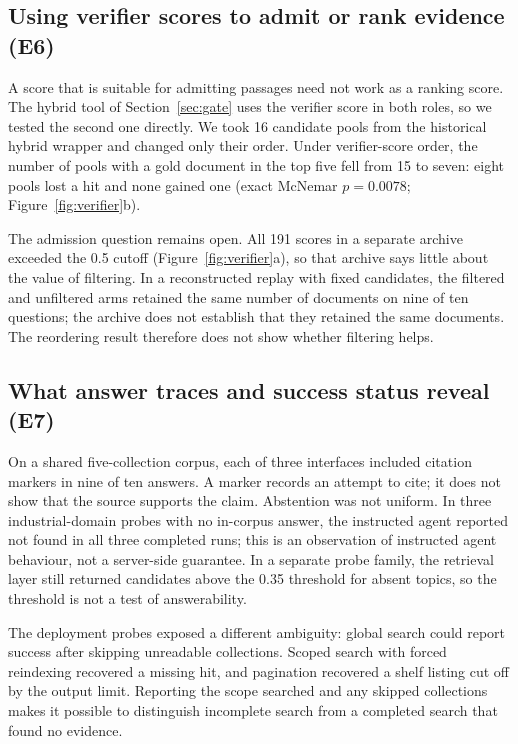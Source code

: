\subsection{Using verifier scores to admit or rank evidence (E6)}
\label{sec:e6}
\label{sec:inflation}\label{sec:eval-verify}\label{sec:exp-e6}
A score that is suitable for admitting passages need not work as a ranking
score. The hybrid tool of Section~\ref{sec:gate} uses the verifier score in
both roles, so we tested the second one directly. We took 16 candidate pools
from the historical hybrid wrapper and changed only their order. Under
verifier-score order, the number of pools with a gold document in the top
five fell from 15 to seven: eight pools lost a hit and none gained one
(exact McNemar $p=0.0078$; Figure~\ref{fig:verifier}b).

The admission question remains open. All 191 scores in a separate archive
exceeded the 0.5 cutoff (Figure~\ref{fig:verifier}a), so that archive says
little about the value of filtering. In a reconstructed replay with fixed
candidates, the filtered and unfiltered arms retained the same number of
documents on nine of ten questions; the archive does not establish that they
retained the same documents. The reordering result therefore does not show
whether filtering helps.

\subsection{What answer traces and success status reveal (E7)}
\label{sec:e5}
\label{sec:agentic}\label{sec:abstention}\label{sec:composition}\label{sec:eval-agent}
\label{sec:sysarms}\label{sec:e7}\label{sec:exp-e7}
On a shared five-collection corpus, each of three interfaces included
citation markers in nine of ten answers. A marker records an attempt to
cite; it does not show that the source supports the claim. Abstention was
not uniform. In three industrial-domain probes with no in-corpus answer, the
instructed agent reported not found in all three completed runs; this is an
observation of instructed agent behaviour, not a server-side guarantee. In a
separate probe family, the retrieval layer still returned candidates above
the 0.35 threshold for absent topics, so the threshold is not a test of
answerability.

The deployment probes exposed a different ambiguity: global search could
report success after skipping unreadable collections. Scoped search with
forced reindexing recovered a missing hit, and pagination recovered a shelf
listing cut off by the output limit. Reporting the scope searched and any
skipped collections makes it possible to distinguish incomplete search from
a completed search that found no evidence.

